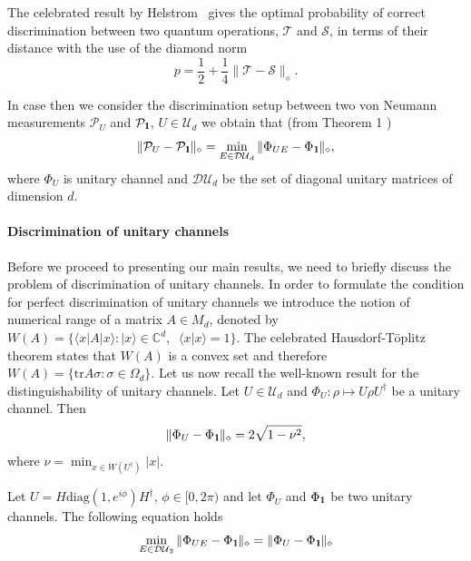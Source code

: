 \documentclass[preprint,12pt, a4paper]{elsarticle}
\newcommand{\ket}[1]{\ensuremath{|#1\rangle}}
\newcommand{\bra}[1]{\ensuremath{\langle#1|}}
\newcommand{\braket}[2]{\ensuremath{\langle{#1}|{#2}\rangle}}
\newcommand{\1}{{\rm 1\hspace{-0.9mm}l}}
\newcommand{\Id}{{\rm 1\hspace{-0.9mm}l}}
\newcommand{\TT}{\mathcal{T}}
\newcommand{\PP}{\mathcal{P}}
\renewcommand{\SS}{\mathcal{S}}
\newcommand{\UU}{\mathcal{U}}
\newcommand{\diaguni}{\ensuremath{\mathcal{DU}}}
\newcommand{\diag}{\mathrm{diag}}
\newcommand{\tr}{\mathrm{tr}}
\newtheorem{proposition}{Proposition}
\begin{document}
The celebrated result by Helstrom~\cite{helstrom1976quantum} gives the optimal  probability of correct discrimination between two quantum operations, $\TT$  and $\SS$, 
in terms of their distance with the use of the diamond norm
\begin{equation}
p =  \frac12 + \frac14 \| \TT - \SS \|_\diamond.
\end{equation}

In case then 
we consider the discrimination setup between two von Neumann 
measurements $\PP_U$ and $\PP_\Id$, $U\in \UU_d$ we obtain that (from Theorem 1 \cite{puchala2018strategies})
\begin{equation}
\|\PP_U - \PP_\Id\|_\diamond = \min_{E \in \diaguni_d} \|\Phi_{UE} - 
\Phi_\Id\|_\diamond,
\end{equation}
where $\Phi_U$ is unitary channel and 
$\diaguni_d$ be the set of diagonal unitary matrices of dimension $d$. 



\paragraph{Discrimination of unitary channels}

Before we proceed to presenting our main results, we need to briefly discuss the
problem of discrimination of unitary channels.  In order to formulate the condition for perfect
discrimination of unitary channels we introduce the notion of numerical range of
a matrix $A \in M_d$, denoted by $W(A) =\{\bra{x}A\ket{x}: \ket{x} \in 
\mathbb{C}^d, \;
\;\braket{x}{x}=1\}$. The celebrated Hausdorf-T\"oplitz
theorem states that
$W(A)$ is a convex set and therefore $W(A) =\{\tr A \sigma : \sigma \in \Omega_d
\}$. Let us now recall the well-known result for the
distinguishability of unitary channels.
	Let $U \in \UU_d$ and $\Phi_U: \rho \mapsto U \rho U^\dagger$ be a unitary 
	channel. 
	Then 
	\begin{equation}
	\| \Phi_U  - \Phi_{\1} \|_\diamond = 2 \sqrt{1-\nu^2},
	\end{equation}
	where $\nu = \min_{x \in W(U^\dagger)} |x|  $. 

 Let $U = H \diag(1, e^{i \phi}) H^\dagger$, $\phi \in [0, 2\pi)$ and	let 
 $\Phi_U$ and $\Phi_\Id$ be two unitary channels. The following equation holds 
	\begin{equation}
	\min_{E \in \diaguni_2} \|\Phi_{UE} - 
	\Phi_\Id\|_\diamond = \|\Phi_{U} - 
	\Phi_\Id\|_\diamond
	\end{equation}
\end{document}
